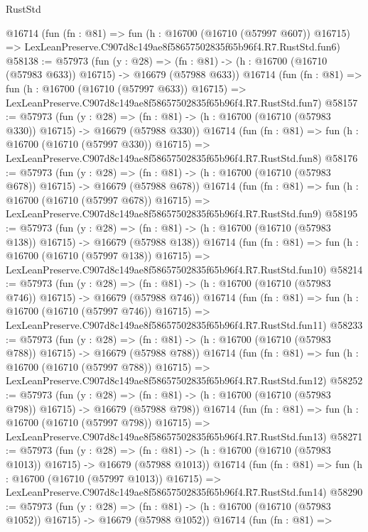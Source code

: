 \begin{lexlean}{RustStd}
\begin{coremodule}
    @16714
    (fun (fn : @81) =>
    fun (h : @16700 (@16710 (@57997 @607)) @16715) =>
    LexLeanPreserve.C907d8c149ae8f58657502835f65b96f4.R7.RustStd.fun6)
@58138 := @57973
    (fun (y : @28) =>
    (fn : @81) -> (h : @16700 (@16710 (@57983 @633)) @16715) -> @16679 (@57988 @633))
    @16714
    (fun (fn : @81) =>
    fun (h : @16700 (@16710 (@57997 @633)) @16715) =>
    LexLeanPreserve.C907d8c149ae8f58657502835f65b96f4.R7.RustStd.fun7)
@58157 := @57973
    (fun (y : @28) =>
    (fn : @81) -> (h : @16700 (@16710 (@57983 @330)) @16715) -> @16679 (@57988 @330))
    @16714
    (fun (fn : @81) =>
    fun (h : @16700 (@16710 (@57997 @330)) @16715) =>
    LexLeanPreserve.C907d8c149ae8f58657502835f65b96f4.R7.RustStd.fun8)
@58176 := @57973
    (fun (y : @28) =>
    (fn : @81) -> (h : @16700 (@16710 (@57983 @678)) @16715) -> @16679 (@57988 @678))
    @16714
    (fun (fn : @81) =>
    fun (h : @16700 (@16710 (@57997 @678)) @16715) =>
    LexLeanPreserve.C907d8c149ae8f58657502835f65b96f4.R7.RustStd.fun9)
@58195 := @57973
    (fun (y : @28) =>
    (fn : @81) -> (h : @16700 (@16710 (@57983 @138)) @16715) -> @16679 (@57988 @138))
    @16714
    (fun (fn : @81) =>
    fun (h : @16700 (@16710 (@57997 @138)) @16715) =>
    LexLeanPreserve.C907d8c149ae8f58657502835f65b96f4.R7.RustStd.fun10)
@58214 := @57973
    (fun (y : @28) =>
    (fn : @81) -> (h : @16700 (@16710 (@57983 @746)) @16715) -> @16679 (@57988 @746))
    @16714
    (fun (fn : @81) =>
    fun (h : @16700 (@16710 (@57997 @746)) @16715) =>
    LexLeanPreserve.C907d8c149ae8f58657502835f65b96f4.R7.RustStd.fun11)
@58233 := @57973
    (fun (y : @28) =>
    (fn : @81) -> (h : @16700 (@16710 (@57983 @788)) @16715) -> @16679 (@57988 @788))
    @16714
    (fun (fn : @81) =>
    fun (h : @16700 (@16710 (@57997 @788)) @16715) =>
    LexLeanPreserve.C907d8c149ae8f58657502835f65b96f4.R7.RustStd.fun12)
@58252 := @57973
    (fun (y : @28) =>
    (fn : @81) -> (h : @16700 (@16710 (@57983 @798)) @16715) -> @16679 (@57988 @798))
    @16714
    (fun (fn : @81) =>
    fun (h : @16700 (@16710 (@57997 @798)) @16715) =>
    LexLeanPreserve.C907d8c149ae8f58657502835f65b96f4.R7.RustStd.fun13)
@58271 := @57973
    (fun (y : @28) =>
    (fn : @81) -> (h : @16700 (@16710 (@57983 @1013)) @16715) -> @16679 (@57988 @1013))
    @16714
    (fun (fn : @81) =>
    fun (h : @16700 (@16710 (@57997 @1013)) @16715) =>
    LexLeanPreserve.C907d8c149ae8f58657502835f65b96f4.R7.RustStd.fun14)
@58290 := @57973
    (fun (y : @28) =>
    (fn : @81) -> (h : @16700 (@16710 (@57983 @1052)) @16715) -> @16679 (@57988 @1052))
    @16714
    (fun (fn : @81) =>

\end{coremodule}
\end{lexlean}
